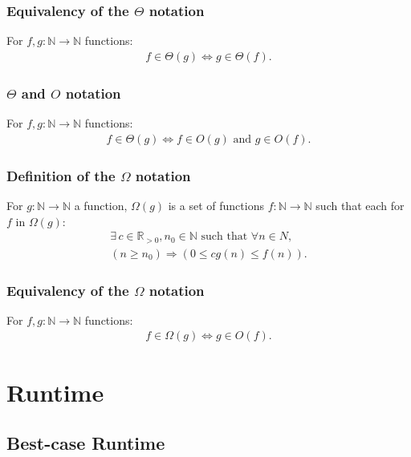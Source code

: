 \documentclass[a4paper, 12pt, twoside]{article}
\begin{document}
\subsubsection{Equivalency of the $\Theta$ notation}

For $f, g : \mathbb{N} \to \mathbb{N}$ functions:
\begin{gather*}
      f \in \Theta(g) \Longleftrightarrow g \in \Theta(f).
\end{gather*}

\subsubsection{$\Theta$ and $O$ notation}
For $f, g : \mathbb{N} \to \mathbb{N}$ functions:
\begin{gather*}
      f \in \Theta(g) \Longleftrightarrow f \in O(g) \text{ and }
      g \in O(f).
\end{gather*}

\subsubsection{Definition of the $\Omega$ notation}

For $g : \mathbb{N} \to \mathbb{N}$ a function, $\Omega(g)$ is a set of
functions $f : \mathbb{N} \to \mathbb{N}$ such that each for
$f$ in $\Omega(g)$:
\begin{gather*}
      \exists \, c \in \mathbb{R}_{> 0}, n_0 \in \mathbb{N}
      \text{ such that } \forall n \in N, \\
      (n \geq n_0) \Rightarrow (0 \leq cg(n) \leq f(n)).
\end{gather*}

\subsubsection{Equivalency of the $\Omega$ notation}

For $f, g : \mathbb{N} \to \mathbb{N}$ functions:
\begin{gather*}
      f \in \Omega(g) \Longleftrightarrow g \in O(f).
\end{gather*}

\newpage

\section{Runtime}

\subsection{Best-case Runtime}
\end{document}

